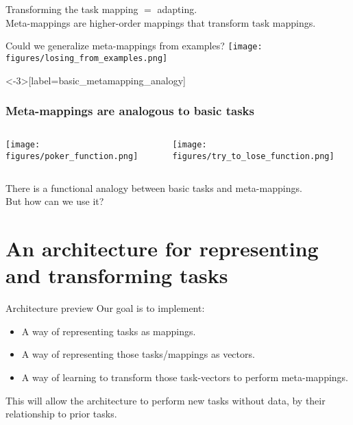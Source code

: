 \documentclass{beamer}
\begin{document}
\begin{frame}[standout]
Transforming the task mapping \(=\) adapting. \\[1em]
Meta-mappings are higher-order mappings that transform task mappings.
\end{frame}

\begin{frame}{Could we generalize meta-mappings from examples?}
\centering
\texttt{[image: figures/losing\_from\_examples.png]}
\end{frame}

\begin{frame}<-3>[label=basic_metamapping_analogy]
\frametitle{Meta-mappings are analogous to basic tasks}
\begin{columns}
\begin{column}{0.5\textwidth}
\vspace{2em}
\texttt{[image: figures/poker\_function.png]}
\end{column}
\begin{column}{0.5\textwidth}
\vspace{2em}
\texttt{[image: figures/try\_to\_lose\_function.png]}
\end{column}
\end{columns}
\end{frame}

\begin{frame}[standout]
There is a functional analogy between basic tasks and meta-mappings. \\[1em]
But how can we use it?
\end{frame}

\section{An architecture for representing and transforming tasks}

\begin{frame}{Architecture preview}
Our goal is to implement:
\begin{itemize}
\item A way of representing tasks as mappings.
\item A way of representing those tasks/mappings as vectors.
\item A way of learning to transform those task-vectors to perform meta-mappings.
\end{itemize}
This will allow the architecture to perform new tasks without data, by their relationship to prior tasks.
\end{frame}
\end{document}
